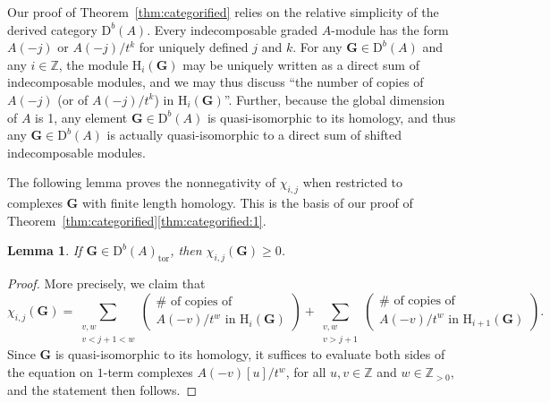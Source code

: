 \documentclass[12pt]{amsart}
\newtheorem{lemma}{Lemma}[section]
\theoremstyle{definition}
\theoremstyle{remark}
\newcommand{\HH}{\mathrm{H}}
\newcommand{\ZZ}{\mathbb{Z}}
\newcommand{\Gbull}{\mathbf{G}}
\newcommand{\DD}{\mathrm{D}}
\begin{document}
Our proof of Theorem~\ref{thm:categorified} relies on the relative simplicity of the derived category $\DD^b(A)$.  Every indecomposable graded $A$-module has the form $A(-j)$ or $A(-j)/t^k$ for uniquely defined $j$ and $k$.  For any $\Gbull\in \DD^b(A)$ and any $i\in \ZZ$, the module $\HH_i(\Gbull)$ may be uniquely written as a direct sum of indecomposable modules, and we may thus discuss ``the number of copies of $A(-j)$ (or of $A(-j)/t^k$) in $\HH_i(\Gbull)$''. Further, because the global dimension of $A$ is 1, any element $\Gbull\in \DD^b(A)$ is quasi-isomorphic to its homology, and thus any $\Gbull\in \DD^b(A)$ is actually quasi-isomorphic to a direct sum of shifted indecomposable modules.

The following lemma proves the nonnegativity of $\chi_{i,j}$ when restricted to complexes $\Gbull$ with finite length homology.  This is the basis of our proof of Theorem~\ref{thm:categorified}\eqref{thm:categorified:1}.

\begin{lemma}\label{lem:chi nonneg}
If $\Gbull\in \DD^b(A)_{\text{tor}}$, then $\chi_{i,j}(\Gbull)\geq 0$.
\end{lemma}
\begin{proof}
More precisely, we claim that
\[
\chi_{i,j}(\Gbull)=\sum_{\substack{v,w\\v<j+1<w}} \begin{pmatrix} \# \text{ of copies  of }\\ A(-v)/t^w \text{ in } \HH_i(\Gbull) \end{pmatrix} +
\sum_{\substack{v,w\\ v>j+1}}\begin{pmatrix} \# \text{ of copies of } \\ A(-v)/t^w \text{ in } \HH_{i+1}(\Gbull) \end{pmatrix}.
\]
Since $\Gbull$ is quasi-isomorphic to its homology, it suffices to evaluate both sides of the equation on $1$-term complexes $A(-v)[u]/t^w$, for all $u,v\in \ZZ$ and $w\in \ZZ_{>0}$, and the statement then follows.
\end{proof}
\end{document}
